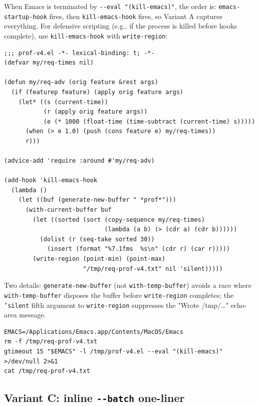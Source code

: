 \begin{expertdepth}
When Emacs is terminated by \texttt{-\/-eval "(kill-emacs)"}, the order is: \texttt{emacs-startup-hook} fires, then \texttt{kill-emacs-hook} fires, so Variant A captures everything. For defensive scripting (e.g., if the process is killed before hooks complete), use \texttt{kill-emacs-hook} with \texttt{write-region}:

\begin{verbatim}
;;; prof-v4.el -*- lexical-binding: t; -*-
(defvar my/req-times nil)

(defun my/req-adv (orig feature &rest args)
  (if (featurep feature) (apply orig feature args)
    (let* ((s (current-time))
           (r (apply orig feature args))
           (e (* 1000 (float-time (time-subtract (current-time) s)))))
      (when (> e 1.0) (push (cons feature e) my/req-times))
      r)))

(advice-add 'require :around #'my/req-adv)

(add-hook 'kill-emacs-hook
  (lambda ()
    (let ((buf (generate-new-buffer " *prof*")))
      (with-current-buffer buf
        (let ((sorted (sort (copy-sequence my/req-times)
                            (lambda (a b) (> (cdr a) (cdr b))))))
          (dolist (r (seq-take sorted 30))
            (insert (format "%7.1fms  %s\n" (cdr r) (car r)))))
        (write-region (point-min) (point-max)
                      "/tmp/req-prof-v4.txt" nil 'silent)))))
\end{verbatim}

Two details: \texttt{generate-new-buffer} (not \texttt{with-temp-buffer}) avoids a race where \texttt{with-temp-buffer} disposes the buffer before \texttt{write-region} completes; the \texttt{'silent} fifth argument to \texttt{write-region} suppresses the "Wrote /tmp/\ldots" echo-area message.

\begin{verbatim}
EMACS=/Applications/Emacs.app/Contents/MacOS/Emacs
rm -f /tmp/req-prof-v4.txt
gtimeout 15 "$EMACS" -l /tmp/prof-v4.el --eval "(kill-emacs)" >/dev/null 2>&1
cat /tmp/req-prof-v4.txt
\end{verbatim}

\end{expertdepth}

\subsection{Variant C: inline \texttt{-\/-batch} one-liner}\label{variant-c-inline---batch-one-liner}

